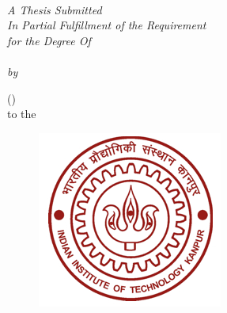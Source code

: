 \documentclass[11pt, a4paper, oneside]{Thesis} %
\begin{document}
\begin{titlepage}
\begin{center}

\HRule \\[0.4cm] %
{\huge \bfseries \ttitle}\\[0.4cm] %
\HRule \\[1.5cm] %
\large \textit{A Thesis Submitted\\ In Partial Fulfillment of the Requirement\\ for the Degree Of\\ \degreename}\\[0.3cm] %
\textit{by}\\[0.4cm]

\href{http://home.iitk.ac.in/~username}{\authornames}

(\rollno)\\ to the

\vfill
\graphicspath{ {./Pictures/} }
\begin{figure}[hb]
  \centering
  \includegraphics[width=0.4\linewidth]{redlogo.jpg}
\end{figure}

\textbf{\DEPTNAME}\\ %
\textsc{ \UNIVNAME}\\[1.5cm] %
\large {\submit}\\[2cm] %


\end{center}
\end{titlepage}
\end{document}

